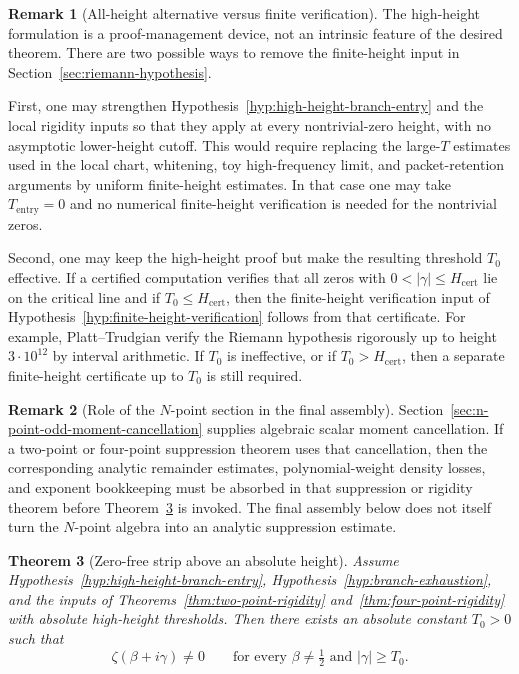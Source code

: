 \documentclass[11pt,a4paper]{amsart}
\numberwithin{equation}{section}
\theoremstyle{plain}
\newtheorem{theorem}{Theorem}[section]
\theoremstyle{definition}
\newtheorem{remark}[theorem]{Remark}
\begin{document}
\begin{remark}[All-height alternative versus finite verification]
\label{rem:all-height-vs-finite-verification}
The high-height formulation is a proof-management device, not an intrinsic
feature of the desired theorem.  There are two possible ways to remove the
finite-height input in Section~\ref{sec:riemann-hypothesis}.

First, one may strengthen Hypothesis~\ref{hyp:high-height-branch-entry} and
the local rigidity inputs so that they apply at every nontrivial-zero height,
with no asymptotic lower-height cutoff.  This would require replacing the
large-\(T\) estimates used in the local chart, whitening, toy high-frequency
limit, and packet-retention arguments by uniform finite-height estimates.  In
that case one may take \(T_{\mathrm{entry}}=0\) and no numerical finite-height
verification is needed for the nontrivial zeros.

Second, one may keep the high-height proof but make the resulting threshold
\(T_0\) effective.  If a certified computation verifies that all zeros with
\(0<|\gamma|\le H_{\mathrm{cert}}\) lie on the critical line and if
\(T_0\le H_{\mathrm{cert}}\), then the finite-height verification input of
Hypothesis~\ref{hyp:finite-height-verification} follows from that certificate.
For example, Platt--Trudgian verify the Riemann hypothesis rigorously up to
height \(3\cdot10^{12}\) by interval arithmetic.  If \(T_0\) is ineffective,
or if \(T_0>H_{\mathrm{cert}}\), then a separate finite-height certificate up
to \(T_0\) is still required.
\end{remark}

\begin{remark}[Role of the \(N\)-point section in the final assembly]
\label{rem:n-point-role-in-aggregation}
Section~\ref{sec:n-point-odd-moment-cancellation} supplies algebraic scalar
moment cancellation.  If a two-point or four-point suppression theorem uses
that cancellation, then the corresponding analytic remainder estimates,
polynomial-weight density losses, and exponent bookkeeping must be absorbed in
that suppression or rigidity theorem before Theorem~\ref{thm:zero-free-strip}
is invoked.  The final assembly below does not itself turn the
\(N\)-point algebra into an analytic suppression estimate.
\end{remark}

\begin{theorem}[Zero-free strip above an absolute height]
\label{thm:zero-free-strip}
Assume Hypothesis~\ref{hyp:high-height-branch-entry},
Hypothesis~\ref{hyp:branch-exhaustion}, and the inputs of
Theorems~\ref{thm:two-point-rigidity} and~\ref{thm:four-point-rigidity}
with absolute high-height thresholds.  Then there exists an absolute constant
\(T_0>0\) such that
\begin{equation}
\label{eq:zero-free-strip}
        \zeta(\beta+i\gamma)\ne 0
        \qquad
        \text{for every } \beta\ne\tfrac12 \text{ and } |\gamma|\ge T_0.
\end{equation}
\end{theorem}
\end{document}
